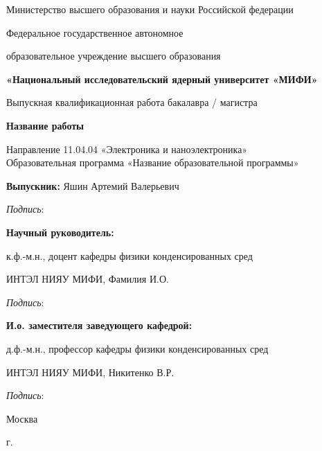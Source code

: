 \begin{titlepage}
\begin{center}
{Министерство высшего образования и науки Российской федерации}

{Федеральное государственное автономное}

{образовательное учреждение высшего образования}

{\textbf{«Национальный исследовательский ядерный университет «МИФИ»}}

\vspace{20mm}

Выпускная квалификационная работа бакалавра / магистра

\textbf{\large Название работы}

\vspace{10mm}
Направление 11.04.04 «Электроника и наноэлектроника»\\
Образовательная программа
«Название образовательной программы»

\vspace{10mm}

\begin{flushleft}
\textbf{Выпускник:} Яшин Артемий Валерьевич

\hspace{10cm} \textit{Подпись}: \space \hrulefill

\textbf{Научный руководитель:} 

к.ф.-м.н., доцент кафедры физики конденсированных сред

ИНТЭЛ НИЯУ МИФИ, Фамилия И.О.

\hspace{10cm} \textit{Подпись}: \space \hrulefill

\textbf{И.о. заместителя заведующего кафедрой:} 

д.ф.-м.н., профессор кафедры физики конденсированных сред 

ИНТЭЛ НИЯУ МИФИ, Никитенко В.Р.

\hspace{10cm} \textit{Подпись}: \space \hrulefill \space
\end{flushleft}

\vfill

{Москва}
\par{\the\year{} г.}
\end{center}
\end{titlepage}